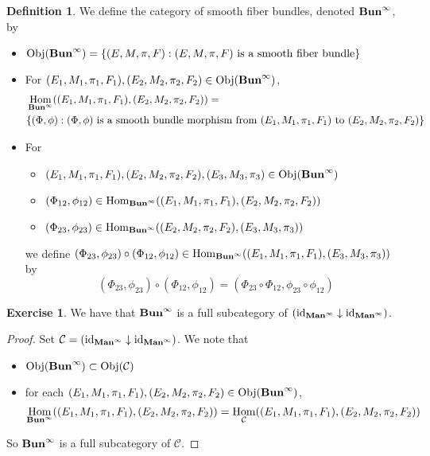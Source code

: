 \documentclass{book}
\theoremstyle{definition}
\newtheorem{defn}[definition]{Definition}
\newtheorem{ex}[definition]{Exercise}
\newcommand{\MC}{\mathcal{C}}
\DeclareMathOperator{\id}{id}
\DeclareMathOperator{\Obj}{Obj}
\DeclareMathOperator{\Hom}{Hom}
\DeclareMathOperator*{\Maninf}{\text{\tbf{Man}}^{\infty}}
\DeclareMathOperator*{\Buninf}{\text{\tbf{Bun}}^{\infty}}
\DeclareMathOperator*{\0}{\mbf{0}}
\DeclareMathOperator*{\1}{\mbf{1}}
\newcommand{\tbf}[1]{\textbf{#1}}
\begin{document}
	\begin{defn}
		We define the category of smooth fiber bundles, denoted $\Buninf$, by 
		\begin{itemize}
			\item $\Obj(\Buninf) = \{(E, M, \pi, F): (E, M, \pi, F) \text{ is a smooth fiber bundle}\}$ 
			\item For $(E_1, M_1, \pi_1, F_1), (E_2, M_2, \pi_2, F_2) \in \Obj(\Buninf)$, 
			\begin{align*}
				& \Hom_{\Buninf}((E_1, M_1, \pi_1, F_1), (E_2, M_2, \pi_2, F_2)) = \\
				& \{(\Phi, \phi): (\Phi, \phi) \text{ is a smooth bundle morphism from $(E_1, M_1, \pi_1, F_1)$ to $(E_2, M_2, \pi_2, F_2)$} \}
			\end{align*}
			\item For 
			\begin{itemize}
				\item $(E_1, M_1, \pi_1, F_1), (E_2, M_2, \pi_2, F_2), (E_3, M_3, \pi_3) \in \Obj(\Buninf)$ 
				\item $(\Phi_{12}, \phi_{12}) \in \Hom_{\Buninf}((E_1, M_1, \pi_1, F_1), (E_2, M_2, \pi_2, F_2))$
				\item $(\Phi_{23}, \phi_{23}) \in \Hom_{\Buninf}((E_2, M_2, \pi_2, F_2), (E_3, M_3, \pi_3))$ 
			\end{itemize}
			we define $(\Phi_{23}, \phi_{23}) \circ (\Phi_{12}, \phi_{12}) \in \Hom_{\Buninf}((E_1, M_1, \pi_1, F_1), (E_3, M_3, \pi_3))$ by 
			$$(\Phi_{23}, \phi_{23}) \circ (\Phi_{12}, \phi_{12}) = (\Phi_{23} \circ \Phi_{12}, \phi_{23} \circ \phi_{12})$$
		\end{itemize}
	\end{defn}

	\begin{ex}
		We have that $\Buninf$ is a full subcategory of $(\id_{\Maninf} \downarrow \id_{\Maninf})$.
	\end{ex}
	
	\begin{proof} Set $\MC = (\id_{\Maninf} \downarrow \id_{\Maninf})$. We note that 
		\begin{itemize}
			\item $\Obj(\Buninf) \subset \Obj(\MC)$
			\item for each $(E_1, M_1, \pi_1, F_1), (E_2, M_2, \pi_2, F_2) \in \Obj(\Buninf)$, 
			$$\Hom_{\Buninf}((E_1, M_1, \pi_1, F_1), (E_2, M_2, \pi_2, F_2)) = \Hom_{\MC}((E_1, M_1, \pi_1, F_1), (E_2, M_2, \pi_2, F_2))$$
		\end{itemize}
		So $\Buninf$ is a full subcategory of $\MC$.
	\end{proof}
\end{document}
